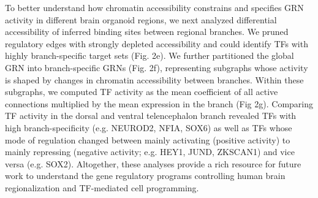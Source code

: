 To better understand how chromatin accessibility constrains and specifies GRN activity in different brain organoid regions, we next analyzed differential accessibility of inferred binding sites between regional branches. We pruned regulatory edges with strongly depleted accessibility and could identify TFs with highly branch-specific target sets (Fig. 2e). We further partitioned the global GRN into branch-specific GRNs (Fig. 2f), representing subgraphs whose activity is shaped by changes in chromatin accessibility between branches. Within these subgraphs, we computed TF activity as the mean coefficient of all active connections multiplied by the mean expression in the branch (Fig 2g). Comparing TF activity in the dorsal and ventral telencephalon branch revealed TFs with high branch-specificity (e.g. NEUROD2, NFIA, SOX6) as well as TFs whose mode of regulation changed between mainly activating (positive activity) to mainly repressing (negative activity; e.g. HEY1, JUND, ZKSCAN1) and vice versa (e.g. SOX2). Altogether, these analyses provide a rich resource for future work to understand the gene regulatory programs controlling human brain regionalization and TF-mediated cell programming.
 
